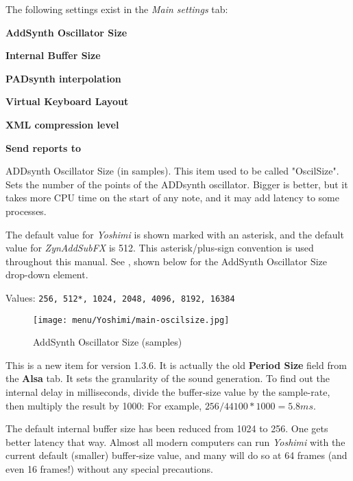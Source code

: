    The following settings exist in the \textsl{Main settings} tab:

   \begin{enumber}
      \item \textbf{AddSynth Oscillator Size}
      \item \textbf{Internal Buffer Size}
      \item \textbf{PADsynth interpolation}
      \item \textbf{Virtual Keyboard Layout}
      \item \textbf{XML compression level}
      \item \textbf{Send reports to}
   \end{enumber}

   \setcounter{ItemCounter}{0}      %

   ADDsynth Oscillator Size (in samples).  This item used to be called
   "OscilSize".  Sets the number of the points of the ADDsynth oscillator.
   Bigger is better, but it takes more CPU time on the start of any note, and
   it may add latency to some processes.

   The default value for \textsl{Yoshimi} is shown marked with an asterisk,
   and the default value for \textsl{ZynAddSubFX} is 512.
   This asterisk/plus-sign convention is used throughout this manual.
   See ,
   shown below for the AddSynth Oscillator Size drop-down element.

   Values: \texttt{256, 512*, 1024, 2048, 4096, 8192, 16384}

\begin{figure}[H]
   \centering 
   \texttt{[image: menu/Yoshimi/main-oscilsize.jpg]}
   \caption[OscilSize Values]{AddSynth Oscillator Size (samples)}
   \label{fig:yoshimi_oscilsize_values}
\end{figure}

   This is a new item for version 1.3.6.  It is actually the old
   \textbf{Period Size} field from the \textbf{Alsa} tab.
   It sets the granularity of the sound generation.
   To find out the internal delay in milliseconds, divide the
   buffer-size value by the sample-rate, then multiply the result by 1000:
   For example, \(256 / 44100 * 1000 = 5.8 ms\).

   The default internal buffer size has been reduced from 1024 to 256.  One
   gets better latency that way.  Almost all modern computers can run
   \textsl{Yoshimi} with the current default (smaller) buffer-size value, and
   many will do so at 64 frames (and even 16 frames!)
   without any special precautions.
   
